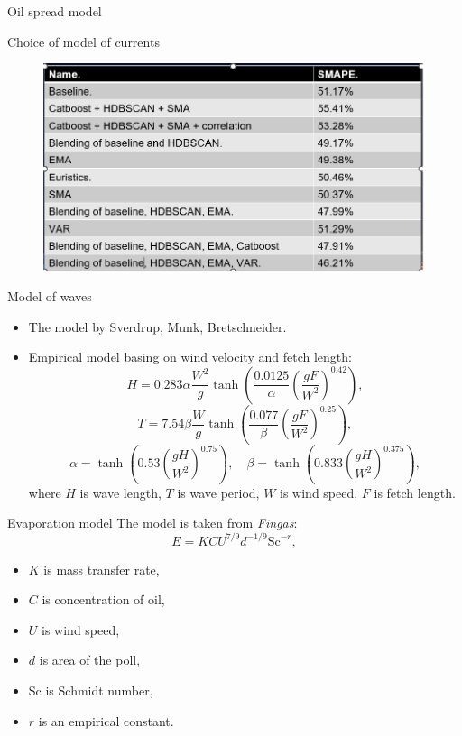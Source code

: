 \documentclass{beamer}
\begin{document}
\begin{section}{Oil spread model}
\begin{frame}{Choice of model of currents}
\begin{figure}[H]
	\centering
	\includegraphics[scale=0.6]{table_2_eng.png}
\end{figure}

\end{frame}

\begin{frame}{Model of waves}
\begin{itemize}
	\item The model by Sverdrup, Munk, Bretschneider.
	\item Empirical model basing on wind velocity and fetch length:
	$$H = 0.283\alpha \frac{W^2}{g}\tanh\left(\frac{0.0125}{\alpha}\left(\frac{gF}{W^2}\right)^{0.42}\right),$$
	$$T = 7.54\beta\frac{W}{g}\tanh\left(\frac{0.077}{\beta}\left(\frac{gF}{W^2}\right)^{0.25}\right),$$
	$$\alpha = \tanh\left(0.53 \left(\frac{gH}{W^2}\right)^{0.75}\right),\quad \beta = \tanh\left(0.833\left(\frac{gH}{W^2}\right)^{0.375}\right),$$
	where $H$ is wave length, $T$ is wave period, $W$ is wind speed, $F$ is fetch length.
\end{itemize}
\end{frame}

\begin{frame}{Evaporation model}
The model is taken from \textit{Fingas}:
$$E = KCU^{7/9}d^{-1/9}\textrm{Sc}^{-r},$$
\begin{itemize}
	\item $K$ is mass transfer rate,
	\item $C$ is concentration of oil,
	\item $U$ is wind speed,
	\item $d$ is area of the poll,
	\item Sc is Schmidt number,
	\item $r$ is an empirical constant. 
\end{itemize}
\end{frame}


\end{section}
\end{document}
